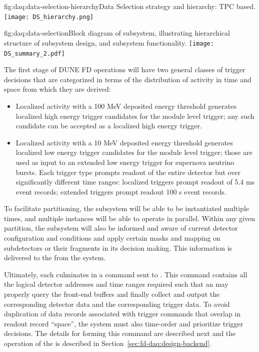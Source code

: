 
\begin{dunefigure}{fig:daq:data-selection-hierarchy}{Data Selection
    strategy and hierarchy: TPC based.}
  \texttt{[image: DS\_hierarchy.png]}
\end{dunefigure}

\begin{dunefigure}{fig:daq:data-selection}{Block diagram of  
     subsystem, illustrating hierarchical structure of
    subsystem design, and subsystem functionality.}
  \texttt{[image: DS\_summary\_2.pdf]}
\end{dunefigure}


The first stage of DUNE FD operations will have two general classes of trigger
decisions that are categorized in terms of the distribution of activity
in time and space from which they are derived: 
\begin{itemize}
\item Localized activity
    with a 100 MeV deposited energy
    threshold generates localized high energy trigger candidates for
    the module level trigger; any such candidate can be accepted as a localized high energy trigger.
\item    Localized activity with a 10 MeV deposited energy threshold
    generates localized low energy trigger candidates for the module
    level trigger; those are used as input to an extended low energy trigger
    for supernova neutrino bursts. Each trigger type prompts readout
    of the entire detector but over significantly different time
    ranges: localized triggers prompt readout of 5.4 ms event records; extended
    triggers prompt readout 100 s event records. 
\end{itemize}

To facilitate partitioning, the  subsystem will be
able to be instantiated multiple times, and multiple instances will be
able to operate in parallel. Within any
given partition, the  subsystem will also be
informed and aware of current detector configuration and conditions and
apply certain masks and mapping on subdetectors or their fragments in
its decision making. This information is delivered to the
 from the  system.

Ultimately, each  culminates in a command sent to . 
This command contains all the logical detector addresses and time ranges
required such that an  may properly query the front-end
buffers and finally collect and output the corresponding detector data
and the corresponding trigger data. To avoid duplication of data
records associated with trigger commands that overlap in readout
record ``space'', the  system must also time-order and
prioritize trigger decisions. The details for forming this
command are described next and the operation of the  is
described in Section~\ref{sec:fd-daq:design-backend}.

